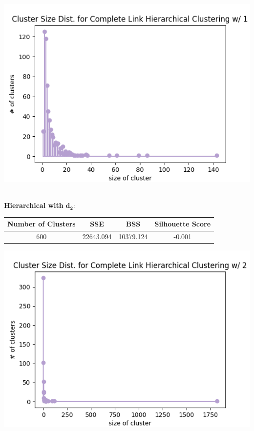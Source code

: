 \documentclass[fleqn]{article}
\begin{document}
\begin{minipage}{0.35\textwidth}
\includegraphics[scale=0.35]{images/size_dist_hc_d1.png}\end{minipage}\\
\textbf{Hierarchical with }$\mathbf{d_2}$:\\
\begin{minipage}{0.65\textwidth}
\begin{tabular}{|c|c|c|c|}
    \hline
    \textbf{Number of Clusters} & \textbf{SSE} &\textbf{BSS} &\textbf{Silhouette Score}\\
    \hline
    600 & 22643.094 & 10379.124 & -0.001\\
    \hline
\end{tabular}
\end{minipage}
\begin{minipage}{0.35\textwidth}
\includegraphics[scale=0.35]{images/size_dist_hc_d2.png}\end{minipage}\\
\end{document}
